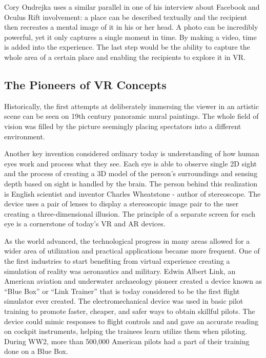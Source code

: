 \documentclass[12pt, a4paper]{article}
\begin{document}
Cory Ondrejka uses a similar parallel in one of his interview about Facebook and Oculus Rift involvement: a place can be described textually and the recipient then recreates a mental image of it in his or her head. A photo can be incredibly powerful, yet it only captures a single moment in time. By making a video, time is added into the experience. The last step would be the ability to capture the whole area  of a certain place and enabling the recipients to explore it in VR.

\subsection{The Pioneers of VR Concepts}
Historically, the first attempts at deliberately immersing the viewer in an artistic scene can be seen on 19th century panoramic mural paintings. The whole field of vision was filled by the picture seemingly placing spectators into a different environment.

Another key invention considered ordinary today is understanding of how human eyes work and process what they see. Each eye is able to observe single 2D sight and the process of creating a 3D model of the person’s surroundings and sensing depth based on sight is handled by the brain. The person behind this realization is English scientist and inventor Charles Wheatstone - author of stereoscope. The device uses a pair of lenses to display a stereoscopic image pair to the user creating a three-dimensional illusion. The principle of a separate screen for each eye is a cornerstone of today’s VR and AR devices.


As the world advanced, the technological progress in many areas allowed for a wider area of utilization and practical applications became more frequent. One of the first industries to start benefiting from virtual experience creating a simulation of reality was aeronautics and military. Edwin Albert Link, an American aviation and underwater archaeology pioneer created a device known as “Blue Box” or “Link Trainer” that is today considered to be the first flight simulator ever created. The electromechanical device was used in basic pilot training to promote faster, cheaper, and safer ways to obtain skillful pilots. The device could mimic responses to flight controls and and gave an accurate reading on cockpit instruments, helping the trainees learn utilize them when piloting. During WW2, more than 500,000 American  pilots had a part of their training done on a Blue Box.
\end{document}
